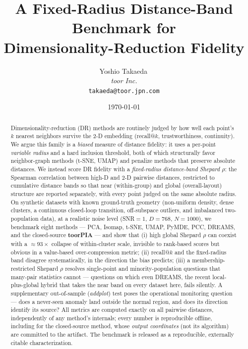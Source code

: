 \documentclass[11pt]{article}
\title{\textbf{A Fixed-Radius Distance-Band Benchmark for\\
Dimensionality-Reduction Fidelity}}
\author{
  Yoshio Takaeda\,\orcidlink{0009-0005-4968-9456}\\
  \textit{toor Inc.}\\
  \texttt{takaeda@toor.jpn.com}
}
\date{\today}
\begin{document}
\maketitle

\begin{abstract}
Dimensionality-reduction (DR) methods are routinely judged by how well each
point's $k$ nearest neighbors survive the 2-D embedding
(recall@$k$, trustworthiness, continuity). We argue this family is a
\emph{biased} measure of distance fidelity: it uses a per-point
\emph{variable radius} and a hard inclusion threshold, both of which
structurally favor neighbor-graph methods (t-SNE, UMAP) and penalize
methods that preserve absolute distances. We instead score DR fidelity with
a \emph{fixed-radius distance-band Shepard $\rho$}: the Spearman correlation
between high-D and 2-D pairwise distances, restricted to cumulative distance
bands so that near (within-group) and global (overall-layout) structure are
reported separately, with every point judged on the same absolute radius.
On synthetic datasets with known ground-truth geometry
(non-uniform density, dense clusters, a continuous closed-loop transition,
off-subspace outliers, and imbalanced two-population data),
at a realistic noise level (SNR${=}1$, $D{=}768$, $N{=}1000$), we benchmark
eight methods --- PCA, Isomap, t-SNE, UMAP, PyMDE, PCC, DREAMS, and the
closed-source \textbf{toorPIA} --- and show that (i) high global Shepard
$\rho$ can coexist
with a ${\approx}93\times$ collapse of within-cluster scale, invisible to
rank-based scores but obvious in a value-based over-compression metric;
(ii) recall@$k$ and the fixed-radius band disagree systematically, in the
direction the bias predicts; (iii) a membership-restricted Shepard $\rho$
resolves single-point and minority-population questions that many-pair
statistics cannot --- questions on which even DREAMS, the recent
local-plus-global hybrid that takes the near band on every dataset here,
fails silently. A supplementary out-of-sample (\emph{addplot}) test poses
the operational monitoring question --- does a never-seen anomaly land outside
the normal region, and does its direction identify its source? All metrics are
computed exactly on all pairwise distances, independently of any method's
internals; every number is reproducible offline, including for the
closed-source method, whose \emph{output coordinates} (not its algorithm) are
committed to the artifact. The benchmark is released as a
reproducible, externally citable characterization.
\end{abstract}
\end{document}
